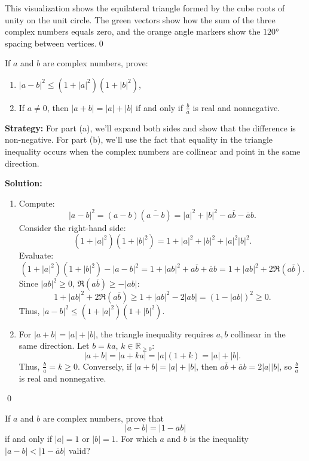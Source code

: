 This visualization shows the equilateral triangle formed by the cube roots of unity on the unit circle. The green vectors show how the sum of the three complex numbers equals zero, and the orange angle markers show the $120°$ spacing between vertices.\qed


\begin{problembox}
If \( a \) and \( b \) are complex numbers, prove:
\begin{enumerate}[label=\alph*)]
\item \( |a - b|^2 \leq (1 + |a|^2)(1 + |b|^2) \),
\item If \( a \neq 0 \), then \( |a + b| = |a| + |b| \) if and only if \( \frac{b}{a} \) is real and nonnegative.
\end{enumerate}
\end{problembox}

\noindent\textbf{Strategy:} For part (a), we'll expand both sides and show that the difference is non-negative. For part (b), we'll use the fact that equality in the triangle inequality occurs when the complex numbers are collinear and point in the same direction.

\bigskip\noindent\textbf{Solution:}
\begin{enumerate}[label=\alph*)]
\item Compute:
\[
|a - b|^2 = (a - b)(\overline{a - b}) = |a|^2 + |b|^2 - a\overline{b} - \overline{a}b.
\]
Consider the right-hand side:
\[
(1 + |a|^2)(1 + |b|^2) = 1 + |a|^2 + |b|^2 + |a|^2 |b|^2.
\]
Evaluate:
\[
(1 + |a|^2)(1 + |b|^2) - |a - b|^2 = 1 + |a b|^2 + a\overline{b} + \overline{a}b = 1 + |a b|^2 + 2\Re(a\overline{b}).
\]
Since \( |a b|^2 \geq 0 \), \( \Re(a\overline{b}) \geq -|a b| \):
\[
1 + |a b|^2 + 2\Re(a\overline{b}) \geq 1 + |a b|^2 - 2|a b| = (1 - |a b|)^2 \geq 0.
\]
Thus, \( |a - b|^2 \leq (1 + |a|^2)(1 + |b|^2) \).
\item For \( |a + b| = |a| + |b| \), the triangle inequality requires \( a, b \) collinear in the same direction. Let \( b = ka \), \( k \in \mathbb{R}_{\geq 0} \):
\[
|a + b| = |a + ka| = |a|(1 + k) = |a| + |b|.
\]
Thus, \( \frac{b}{a} = k \geq 0 \). Conversely, if \( |a + b| = |a| + |b| \), then \( a\overline{b} + \overline{a}b = 2|a||b| \), so \( \frac{b}{a} \) is real and nonnegative.
\end{enumerate}\qed


\begin{problembox}
If \( a \) and \( b \) are complex numbers, prove that
\[
|a - b| = |1 - \overline{a}b|
\]
if and only if \( |a| = 1 \) or \( |b| = 1 \). For which \( a \) and \( b \) is the inequality \( |a - b| < |1 - \overline{a}b| \) valid?
\end{problembox}

